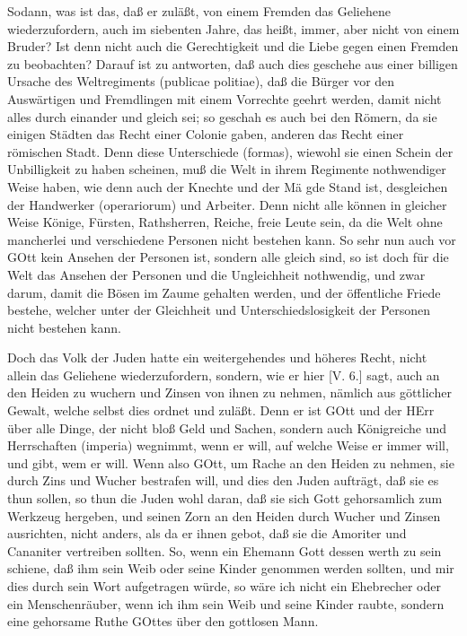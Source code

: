 Sodann, was ist das, daß er zuläßt, von einem Fremden das Geliehene wiederzufordern, auch im siebenten Jahre, das heißt, immer, aber nicht von einem Bruder? Ist denn nicht auch die Gerechtigkeit und die Liebe gegen einen Fremden zu beobachten? Darauf ist zu antworten, daß auch dies geschehe aus einer billigen Ursache des Weltregiments (publicae politiae), daß die Bürger vor den Auswärtigen und Fremdlingen mit einem Vorrechte geehrt werden, damit nicht alles durch einander und gleich sei; so geschah es auch bei den Römern, da sie einigen Städten das Recht einer Colonie gaben, anderen das Recht einer römischen Stadt. Denn diese Unterschiede (formas), wiewohl sie einen Schein der Unbilligkeit zu haben scheinen, muß die Welt in ihrem Regimente nothwendiger Weise haben, wie denn auch der Knechte und der Mä gde Stand ist, desgleichen der Handwerker (operariorum) und Arbeiter. Denn nicht alle können in gleicher Weise Könige, Fürsten, Rathsherren, Reiche, freie Leute sein, da die Welt ohne mancherlei und verschiedene Personen nicht bestehen kann. So sehr nun auch vor GOtt kein Ansehen der Personen ist, sondern alle gleich sind, so ist doch für die Welt das Ansehen der Personen und die Ungleichheit nothwendig, und zwar darum, damit die Bösen im Zaume gehalten werden, und der öffentliche Friede bestehe, welcher unter der Gleichheit und Unterschiedslosigkeit der Personen nicht bestehen kann.

Doch das Volk der Juden hatte ein weitergehendes und höheres Recht, nicht allein das Geliehene wiederzufordern, sondern, wie er hier [V. 6.] sagt, auch an den Heiden zu wuchern und Zinsen von ihnen zu nehmen, nämlich aus göttlicher Gewalt, welche selbst dies ordnet und zuläßt. Denn er ist GOtt und der HErr über alle Dinge, der nicht bloß Geld und Sachen, sondern auch Königreiche und Herrschaften (imperia) wegnimmt, wenn er will, auf welche Weise er immer will, und gibt, wem er will. Wenn also GOtt, um Rache an den Heiden zu nehmen, sie durch Zins und Wucher bestrafen will, und dies den Juden aufträgt, daß sie es thun sollen, so thun die Juden wohl daran, daß sie sich Gott gehorsamlich zum Werkzeug hergeben, und seinen Zorn an den Heiden durch Wucher und Zinsen ausrichten, nicht anders, als da er ihnen gebot, daß sie die Amoriter und Cananiter vertreiben sollten. So, wenn ein Ehemann Gott dessen werth zu sein schiene, daß ihm sein Weib oder seine Kinder genommen werden sollten, und mir dies durch sein Wort aufgetragen würde, so wäre ich nicht ein Ehebrecher oder ein Menschenräuber, wenn ich ihm sein Weib und seine Kinder raubte, sondern eine gehorsame Ruthe GOttes über den gottlosen Mann.

